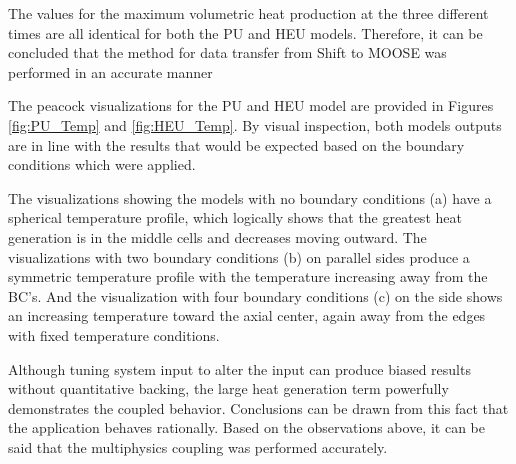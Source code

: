 \documentclass{anstrans}
\begin{document}
The values for the maximum volumetric heat production at the three different times are all identical for both the PU and HEU models. Therefore, it can be concluded that the method for data transfer from Shift to MOOSE was performed in an accurate manner

The peacock visualizations for the PU and HEU model are provided in Figures \ref{fig:PU_Temp} and \ref{fig:HEU_Temp}. By visual inspection, both models outputs are in line with the results that would be expected based on the boundary conditions which were applied. 

The visualizations showing the models with no boundary conditions (a) have a spherical temperature profile, which logically shows that the greatest heat generation is in the middle cells and decreases moving outward. The visualizations with two boundary conditions (b) on parallel sides produce a symmetric temperature profile with the temperature increasing away from the BC's. And the visualization with four boundary conditions (c) on the side shows an increasing temperature toward the axial center, again away from the edges with fixed temperature conditions.

Although tuning system input to alter the input can produce biased results without quantitative backing, the large heat generation term powerfully demonstrates the coupled behavior. Conclusions can be drawn from this fact that the application behaves rationally. Based on the observations above, it can be said that the multiphysics coupling was performed accurately.
\end{document}
